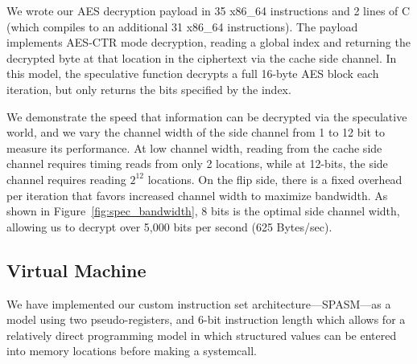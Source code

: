 We wrote our AES decryption payload in 35 x86\_64 instructions and 2 lines of C
(which compiles to an additional 31 x86\_64 instructions). The payload
implements AES-CTR mode decryption, reading a global index and returning the
decrypted byte at that location in the ciphertext via the cache side channel.
In this model, the speculative function decrypts a full 16-byte AES block each
iteration, but only returns the bits specified by the index.

We demonstrate the speed that information can be decrypted via the speculative
world, and we vary the channel width of the side channel from 1 to 12 bit to
measure its performance. At low channel width, reading from the cache side
channel requires timing reads from only 2 locations, while at 12-bits, the side
channel requires reading $2^{12}$ locations. On the flip side, there is a fixed
overhead per iteration that favors increased channel width to maximize
bandwidth. As shown in Figure~\ref{fig:spec_bandwidth}, 8 bits is the optimal
side channel width, allowing us to decrypt over 5,000 bits per second (625
Bytes/sec).



\FigSpecBandwidth

\subsection{Virtual Machine}
\label{subsec:spasm}


We have implemented our custom instruction set architecture---SPASM---as a model
using two pseudo-registers, and
6-bit instruction length which allows for a relatively direct programming model
in which structured values can be entered into memory locations before making
a systemcall.


%


